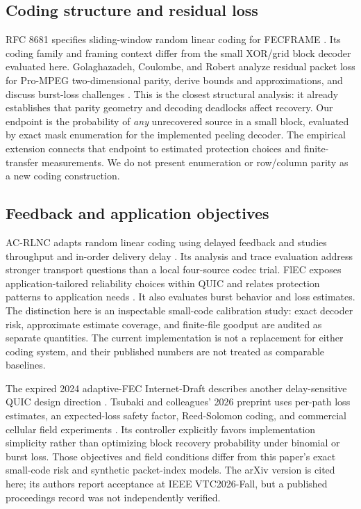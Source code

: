\documentclass[11pt,a4paper]{article}
\begin{document}
\subsection{Coding structure and residual loss}
RFC 8681 specifies sliding-window random linear coding for FECFRAME \cite{roca2020rlc}. Its coding family and framing context differ from the small XOR/grid block decoder evaluated here. Golaghazadeh, Coulombe, and Robert analyze residual packet loss for Pro-MPEG two-dimensional parity, derive bounds and approximations, and discuss burst-loss challenges \cite{golaghazadeh2022parity}. This is the closest structural analysis: it already establishes that parity geometry and decoding deadlocks affect recovery. Our endpoint is the probability of \emph{any} unrecovered source in a small block, evaluated by exact mask enumeration for the implemented peeling decoder. The empirical extension connects that endpoint to estimated protection choices and finite-transfer measurements. We do not present enumeration or row/column parity as a new coding construction.

\subsection{Feedback and application objectives}
AC-RLNC adapts random linear coding using delayed feedback and studies throughput and in-order delivery delay \cite{cohen2020adaptive}. Its analysis and trace evaluation address stronger transport questions than a local four-source codec trial. FlEC exposes application-tailored reliability choices within QUIC and relates protection patterns to application needs \cite{michel2023flec}. It also evaluates burst behavior and loss estimates. The distinction here is an inspectable small-code calibration study: exact decoder risk, approximate estimate coverage, and finite-file goodput are audited as separate quantities. The current implementation is not a replacement for either coding system, and their published numbers are not treated as comparable baselines.

The expired 2024 adaptive-FEC Internet-Draft describes another delay-sensitive QUIC design direction \cite{moskvitin2024adaptive}. Tsubaki and colleagues' 2026 preprint uses per-path loss estimates, an expected-loss safety factor, Reed-Solomon coding, and commercial cellular field experiments \cite{tsubaki2026adaptive}. Its controller explicitly favors implementation simplicity rather than optimizing block recovery probability under binomial or burst loss. Those objectives and field conditions differ from this paper's exact small-code risk and synthetic packet-index models. The arXiv version is cited here; its authors report acceptance at IEEE VTC2026-Fall, but a published proceedings record was not independently verified.
\end{document}
